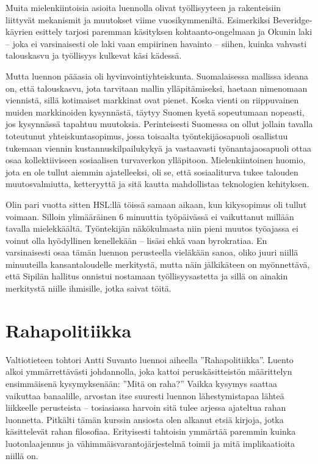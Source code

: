 \documentclass[12pt]{article}
\begin{document}
Muita mielenkiintoisia asioita luennolla olivat työllisyyteen ja rakenteisiin
liittyvät mekanismit ja muutokset viime vuosikymmeniltä. Esimerkiksi
Beveridge-käyrien esittely tarjosi paremman käsityksen kohtaanto-ongelmaan ja
Okunin laki -- joka ei varsinaisesti ole laki vaan empiirinen havainto --
siihen, kuinka vahvasti talouskasvu ja työllisyys kulkevat käsi kädessä.

Mutta luennon pääasia oli hyvinvointiyhteiskunta. Suomalaisessa mallissa ideana
on, että talouskasvu, jota tarvitaan mallin ylläpitämiseksi, haetaan nimenomaan
viennistä, sillä kotimaiset markkinat ovat pienet. Koska vienti on riippuvainen
muiden markkinoiden kysynnästä, täytyy Suomen kyetä sopeutumaan nopeasti, jos
kysynnässä tapahtuu muutoksia. Perinteisesti Suomessa on ollut jollain tavalla
toteutunut yhteiskuntasopimus, jossa toisaalta työntekijäosapuoli osallistuu
tukemaan viennin kustannuskilpailukykyä ja vastaavasti työnantajaosapuoli ottaa
osaa kollektiiviseen sosiaalisen turvaverkon ylläpitoon. Mielenkiintoinen
huomio, jota en ole tullut aiemmin ajatelleeksi, oli se, että sosiaaliturva
tukee talouden muutosvalmiutta, ketteryyttä ja sitä kautta mahdollistaa
teknologien kehityksen.

Olin pari vuotta sitten HSL:llä töissä samaan aikaan, kun kikysopimus oli
tullut voimaan. Silloin ylimääräinen 6 minuuttia työpäivässä ei vaikuttanut
millään tavalla mielekkäältä. Työntekijän näkökulmasta niin pieni muutos
työajassa ei voinut olla hyödyllinen kenellekään -- lisäsi ehkä vaan
byrokratiaa. En varsinaisesti osaa tämän luennon perusteella vieläkään sanoa,
oliko juuri niillä minuuteilla kansantaloudelle merkitystä, mutta näin
jälkikäteen on myönnettävä, että Sipilän hallitus onnistui nostamaan
työllisyysastetta ja sillä on ainakin merkitystä niille ihmisille, jotka saivat
töitä.


\newpage
\section{Rahapolitiikka}

Valtiotieteen tohtori Antti Suvanto luennoi aiheella ''Rahapolitiikka''. Luento
alkoi ymmärrettävästi johdannolla, joka kattoi peruskäsitteistön määrittelyn
ensimmäisenä kysymyksenään: ''Mitä on raha?'' Vaikka kysymys saattaa vaikuttaa
banaalille, arvostan itse suuresti luennon lähestymistapaa lähteä liikkeelle
perusteista -- tosiasiassa harvoin sitä tulee arjessa ajateltua rahan
luonnetta. Pitkälti tämän kurssin ansiosta olen alkanut etsiä kirjoja, jotka
käsittelevät rahan filosofiaa. Erityisesti tahtoisin ymmärtää paremmin kuinka
luotonlaajennus ja vähimmäisvarantojärjestelmä toimii ja mitä implikaatioita
niillä on.
\end{document}
